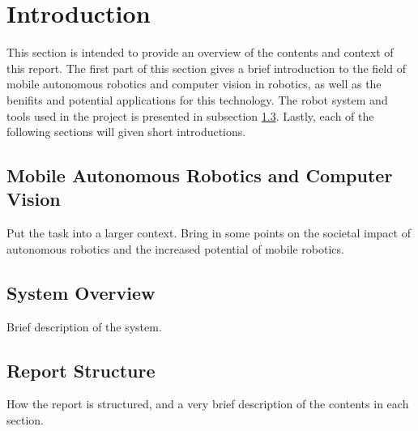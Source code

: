 \section{Introduction}

This section is intended to provide an overview of the contents and context of this report. The first part of this section gives a brief introduction to the field of mobile autonomous robotics and computer vision in robotics, as well as the benifits and potential applications for this technology. The robot system and tools used in the project is presented in subsection \ref{}. Lastly, each of the following sections will given short introductions.

  
\subsection{Mobile Autonomous Robotics and Computer Vision}

Put the task into a larger context. Bring in some points on the societal impact of autonomous robotics and the increased potential of mobile robotics.  

\subsection{System Overview}

Brief description of the system.

\subsection{Report Structure}
How the report is structured, and a very brief description of the contents in each section.